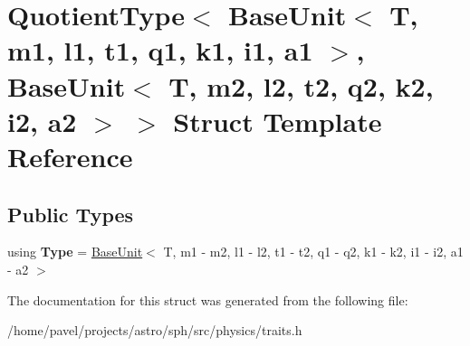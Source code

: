 \hypertarget{structQuotientType_3_01BaseUnit_3_01T_00_01m1_00_01l1_00_01t1_00_01q1_00_01k1_00_01i1_00_01a1_016a4193b5e73585d61948de1bb71b30c8}{}\section{Quotient\+Type$<$ Base\+Unit$<$ T, m1, l1, t1, q1, k1, i1, a1 $>$, Base\+Unit$<$ T, m2, l2, t2, q2, k2, i2, a2 $>$ $>$ Struct Template Reference}
\label{structQuotientType_3_01BaseUnit_3_01T_00_01m1_00_01l1_00_01t1_00_01q1_00_01k1_00_01i1_00_01a1_016a4193b5e73585d61948de1bb71b30c8}
\subsection*{Public Types}
\begin{DoxyCompactItemize}
\item 
\hypertarget{structQuotientType_3_01BaseUnit_3_01T_00_01m1_00_01l1_00_01t1_00_01q1_00_01k1_00_01i1_00_01a1_016a4193b5e73585d61948de1bb71b30c8_acb12f858ccbe681dcc2eca700d07ef1c}{}\label{structQuotientType_3_01BaseUnit_3_01T_00_01m1_00_01l1_00_01t1_00_01q1_00_01k1_00_01i1_00_01a1_016a4193b5e73585d61948de1bb71b30c8_acb12f858ccbe681dcc2eca700d07ef1c} 
using {\bfseries Type} = \hyperlink{classBaseUnit}{Base\+Unit}$<$ T, m1 -\/ m2, l1 -\/ l2, t1 -\/ t2, q1 -\/ q2, k1 -\/ k2, i1 -\/ i2, a1 -\/ a2 $>$
\end{DoxyCompactItemize}


The documentation for this struct was generated from the following file\+:\begin{DoxyCompactItemize}
\item 
/home/pavel/projects/astro/sph/src/physics/traits.\+h\end{DoxyCompactItemize}
